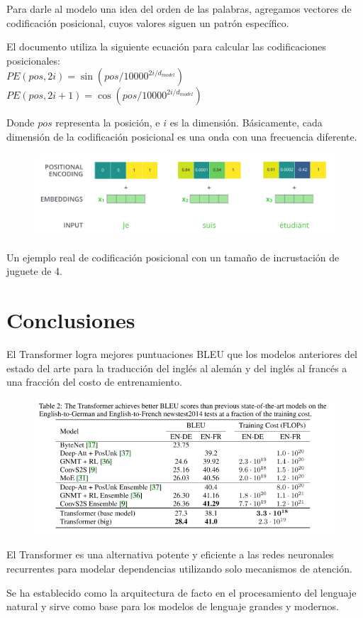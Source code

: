 Para darle al modelo una idea del orden de las palabras, agregamos vectores de codificación posicional, cuyos valores siguen un patrón específico.

El documento utiliza la siguiente ecuación para calcular las codificaciones posicionales:\\
$PE(pos,2i) = \sin(pos/10000^{2i/d_{model}})$
$PE(pos,2i+1) = \cos(pos/10000^{2i/d_{model}})$

Donde $pos$ representa la posición, e $i$ es la dimensión. Básicamente, cada dimensión de la codificación posicional es una onda con una frecuencia diferente.

\begin{figure}[h]
  \centering
  \includegraphics[scale=0.25]{pics/transformer_positional_encoding_example.png}
\end{figure}

Un ejemplo real de codificación posicional con un tamaño de incrustación de juguete de 4.


\section{Conclusiones}

El Transformer logra mejores puntuaciones BLEU que los modelos anteriores del estado del arte para la traducción del inglés al alemán y del inglés al francés a una fracción del costo de entrenamiento.

\begin{figure}[h]
  \centering
  \includegraphics[scale=0.29]{pics/transformerresults.png}
\end{figure}

El Transformer es una alternativa potente y eficiente a las redes neuronales recurrentes para modelar dependencias utilizando solo mecanismos de atención.

Se ha establecido como la arquitectura de facto en el procesamiento del lenguaje natural y sirve como base para los modelos de lenguaje grandes y modernos.

